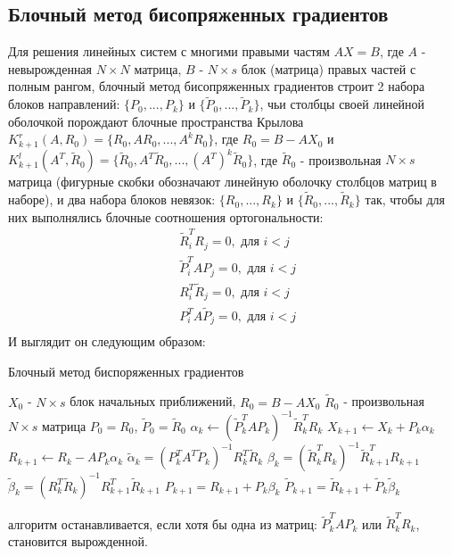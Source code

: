 \subsection[Блочный метод бисопряженных градиентов]{Блочный метод бисопряженных градиентов \cite{OLEARY1980293}}
Для решения линейных систем с многими правыми частям $AX=B$, где $A$ - невырожденная $N \times N$ матрица,
$B$ - $N \times s$ блок (матрица) правых частей с полным рангом,  
блочный метод бисопряженных градиентов строит 2 набора блоков направлений:
$\{ P_0, ... , P_k \}$ и $\{ \tilde{P}_0, ... , \tilde{P}_k \}$, чьи столбцы своей линейной оболочкой
порождают блочные пространства Крылова $K^r_{k+1}(A,R_0) = \{R_0,A R_0, ... ,A^k R_0\}$, где $R_0 = B - A X_0$ и
 $K^l_{k+1}(A^T,\tilde{R}_0) = \{\tilde{R}_0,A^T \tilde{R}_0, ... ,(A^T)^k \tilde{R}_0\}$, где $\tilde{R}_0$ - 
 произвольная $N \times s$ матрица (фигурные скобки обозначают линейную оболочку столбцов матриц в наборе), 
и два набора блоков невязок: $\{R_0, ... , R_k\}$ и $\{\tilde{R}_0, ... , \tilde{R}_k\}$ так, чтобы для них выполнялись 
блочные соотношения ортогональности:
\begin{align}
    &\tilde{R}_i^T R_j = 0, \text{ для } i < j \\
    &\tilde{P}_i^T A P_j = 0, \text{ для } i < j \\
    &R_i^T \tilde{R}_j = 0, \text{ для } i < j \\
    &P_i^T A \tilde{P}_j = 0, \text{ для } i < j \\
\end{align}
И выглядит он следующим образом:
\begin{algorithm}
    \caption{Блочный метод биспоряженных градиентов}
    \begin{algorithmic}
        \State $X_0$ - $N \times s$ блок начальных приближений, $R_0 = B - AX_0$
        \State $\tilde{R}_0$ - произвольная $ N\times s $ матрица
        \State $P_0 = R_0$, $\tilde{P}_0 = \tilde{R}_0$
            \State $\alpha_k \gets (\tilde{P}_k^T A P_k)^{-1} \tilde{R}_k^T R_k$
            \State $X_{k+1} \gets X_k + P_k \alpha_k$
            \State $R_{k+1} \gets R_k - A P_k \alpha_k$
            \State $\tilde{\alpha}_k = (P_k^TA^T \tilde{P}_k)^{-1}R_k^T \tilde{R}_k$
            \State $\beta_k = (\tilde{R}_k^T R_k)^{-1} \tilde{R}_{k+1}^T R_{k+1}$
            \State $\tilde{\beta}_k = (R_k^T \tilde{R}_k)^{-1} R_{k+1}^T \tilde{R}_{k+1}$
            \State $P_{k+1} = R_{k+1} + P_k \beta_k$
            \State $\tilde{P}_{k+1} = \tilde{R}_{k+1} + \tilde{P}_k \tilde{\beta}_k$
        \EndFor 
    \end{algorithmic}
\end{algorithm}
алгоритм останавливается, если хотя бы одна из матриц: $\tilde{P}_k^T A P_k$ или $\tilde{R}_k^T R_k$, становится 
вырожденной. 

